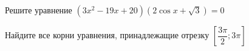 \begin{ex}
	\begin{condition}
		\begin{enumcols}[label=\asbuk*)]
			\item Решите уравнение \( (3x^2 - 19x + 20)(2\cos x +\sqrt{3}) = 0 \)
			\item Найдите все корни уравнения, принадлежащие отрезку \( \left[\dfrac{3\pi}{2};3\pi\right] \)
		\end{enumcols}
	\end{condition}
\end{ex}